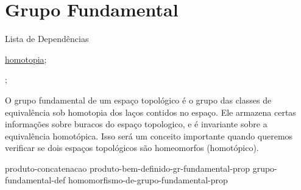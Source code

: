\section{Grupo Fundamental}
\label{grupo-fundamental}

\begin{titlemize}{Lista de Dependências}
	\item \hyperref[Homotopia]{homotopia};\\ %
	\item \hyperref[]{};
\end{titlemize}

O grupo fundamental de um espaço topológico é o grupo das classes de equivalência sob homotopia dos laços contidos no espaço. Ele armazena certas informações sobre buracos do espaço topologico, e é invariante sobre a equivalência homotópica. Isso será um conceito importante quando queremos verificar se dois espaços topológicos são homeomorfos (homotópico).

{produto-concatenacao}%
{produto-bem-definido-gr-fundamental-prop}
{grupo-fundamental-def}
{homomorfismo-de-grupo-fundamental-prop}
